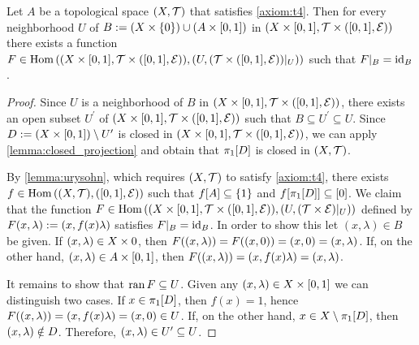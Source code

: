 \begin{lemma} \label{lemma:ext_id}
	Let $A$ be a topological space $\tspace$ that satisfies \ref{axiom:t4}. Then for every neighborhood $U$ of $B := {\left ( X \times \{0\} \right )} \cup {\left ( A \times {\left [ 0, 1 \right ]} \right )}$ in $\prodtspace$ there exists a function $F \in \Hom\pbraces{\prodtspace, \pbraces{U, \pbraces{\mathcal{T} \times \eucl}\vert_U}}$ such that $F\vert_B = \operatorname{id}_B$. 
\end{lemma}
\begin{proof}
	Since $U$ is a neighborhood of $B$ in $\prodtspace$, there exists an open subset $U^\prime$ of $\prodtspace$ such that $B \subseteq U^\prime \subseteq U$. Since $D := {\left ( X \times {\left [ 0,1 \right ]} \right )} \setminus U^\prime$ is closed in $\prodtspace$, we can apply \ref{lemma:closed_projection} and obtain that $\pi_1{\left [ D \right ]}$ is closed in $\tspace$. 
	
	By \ref{lemma:urysohn}, which requires $\tspace$ to satisfy \ref{axiom:t4}, there exists $f \in \Hom\pbraces{\tspace, \eucl}$ such that $f{\left [ A \right ]} \subseteq {\left \{ 1 \right \}}$ and $f{\left [ \pi_1{\left [ D \right ]} \right ]} \subseteq {\left [ 0 \right ]}$. We claim that the function $F \in \Hom\pbraces{\prodtspace, \pbraces{U, \pbraces{\mathcal{T} \times \mathcal{E}}\vert_U}}$ defined by $F{\left ( x, \lambda \right )} := {\left ( x, f(x) \lambda \right )}$ satisfies $F\vert_B = \operatorname{id}_B$. In order to show this let $(x, \lambda) \in B$ be given. If ${\left ( x, \lambda \right )} \in X \times 0$, then $F{\left ( (x, \lambda) \right )} = F{\left ( {\left ( x, 0 \right )} \right )} = {\left ( x, 0 \right )} = {\left ( x, \lambda \right )}$. If, on the other hand, ${\left ( x, \lambda \right )} \in A \times {\left [ 0, 1 \right ]}$, then $F{\left ( {\left ( x, \lambda \right )} \right )} = {\left ( x, f(x) \lambda \right )} = {\left ( x, \lambda \right )}$. 
	
	It remains to show that $\operatorname{ran} F \subseteq U$. Given any ${\left ( x, \lambda \right )} \in X \times {\left [ 0, 1 \right ]}$ we can distinguish two cases. If $x \in \pi_1{\left [ D \right ]}$, then $f(x) =1$, hence $F{\left ( {\left ( x, \lambda \right )} \right )} = {\left ( x, f(x) \lambda \right )} = {\left ( x, 0 \right )} \in U$. If, on the other hand, $x \in X \setminus \pi_1{\left [ D \right ]}$, then ${\left ( x, \lambda \right )} \notin D$. Therefore, ${\left ( x, \lambda \right )} \in U^\prime \subseteq U$.     
\end{proof}

